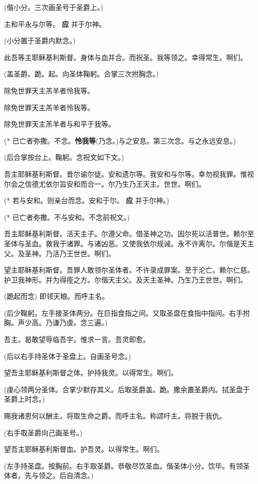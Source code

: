 \documentclass[UTF8,17pt]{ctexart}
\newcommand{\blood}[1]{\textcolor{Mahogany}{#1}}
\begin{document}
(偕⼩分。三次画圣号于圣爵上。)

主\blood{\maltese}和平\blood{\maltese}永\blood{\maltese}与尔等。 \hfill \textbf{应} \quad 并于尔神。

(⼩分置于圣爵内默念。)

此吾等主耶稣基利斯督。⾝体与⾎并合。⽽祝圣。我等领之。幸得常⽣。啊们。

(盖圣爵。跪。起。向圣体鞠躬。合掌三次拊胸念。)

除免世罪天主羔⽺者怜我等。

除免世罪天主羔⽺者怜我等。

除免世罪天主羔⽺者与和平于我等。

(* 已亡者弥撒。不念。\textbf{怜我等}(乃念。)与之安息。第三次念。与之永远安息。)

(后合掌按台上。鞠躬。念祝⽂如下文。)

吾主耶稣基利斯督。昔尔谕尔徒。安和遗尔等。我安和与尔等。幸勿视我罪。惟视尔会之信德尤依尔旨安和⽽合⼀。尔乃⽣乃王天主。世世。啊们。

(* 若与安和。则亲台⽽念。安和于尔。 \quad \textbf{应} \quad 并于尔神。)

(* 已亡者弥撒。不与安和。不念前祝⽂。)

吾主耶稣基利斯督。活天主⼦。尔遵⽗命。借圣神之功。因尔死以活普世。赖尔⾄圣体与圣⾎。救我于诸罪。与诸凶恶。又使我依尔规诫。永不许离尔。尔偕是天主⽗。及圣神。乃活乃王世世。啊们。

望主耶稣基利斯督。吾罪⼈敢领尔圣体者。不许录成罪案。⾄于沦亡。赖尔仁慈。护卫我神形。并为得痊之⽅。尔偕天主⽗。及天主圣神。乃⽣乃王世世。啊们。

(跪起⽽念) \quad 即领天粮。⽽呼主名。

(后少鞠躬。左⼿接圣体两分。在巨指⾷指之间。又取圣盘在⾷指中指间。右⼿拊胸。声少⾼。乃谦乃虔。念三遍。)

吾主。曷敢望辱临吾宇。惟求⼀⾔。吾灵即愈。

(后以右⼿持圣体于圣盘上。⾃画圣号念。)

望吾主耶稣基利斯督之体。护持我灵。以得常⽣。啊们。

(虔⼼领两分圣体。合掌少默存其义。后取圣爵盖。跪。撒余置圣爵内。拭圣盘于圣爵上时念。)

赐我诸恩何以酬主。将取⽣命之爵。⽽呼主名。称颂吁主。将脱于我仇。

(右⼿取圣爵向⼰画圣号。)

望吾主耶稣基利斯督⾎。护吾灵。以得常⽣。啊们。

(左⼿持圣盘。按胸前。右⼿取圣爵。恭敬尽饮圣⾎。偕圣体⼩分。饮毕。有领圣体者。先与领之。后⾃清念。)
\end{document}
